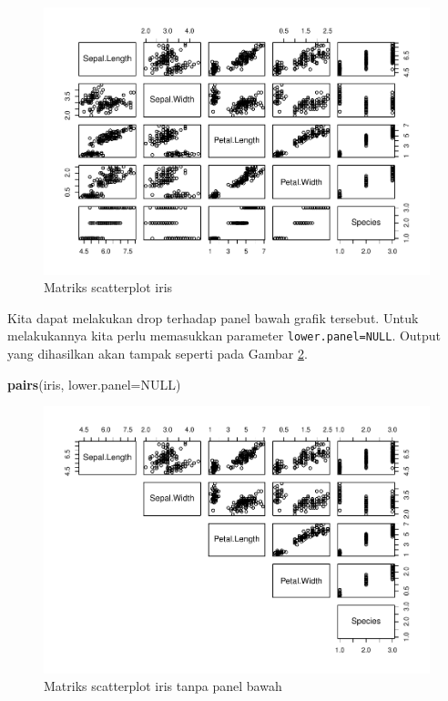 \documentclass[]{book}
\newenvironment{Shaded}{\begin{snugshade}}{\end{snugshade}}
\newcommand{\KeywordTok}[1]{\textcolor[rgb]{0.13,0.29,0.53}{\textbf{#1}}}
\newcommand{\DataTypeTok}[1]{\textcolor[rgb]{0.13,0.29,0.53}{#1}}
\newcommand{\OtherTok}[1]{\textcolor[rgb]{0.56,0.35,0.01}{#1}}
\newcommand{\NormalTok}[1]{#1}
\begin{document}
\begin{figure}

{\centering \includegraphics[width=0.8\linewidth]{EnvStat_files/figure-latex/matscat-1} 

}

\caption{Matriks scatterplot iris}\label{fig:matscat}
\end{figure}

Kita dapat melakukan drop terhadap panel bawah grafik tersebut. Untuk
melakukannya kita perlu memasukkan parameter \texttt{lower.panel=NULL}.
Output yang dihasilkan akan tampak seperti pada Gambar
\ref{fig:matscat2}.

\begin{Shaded}
\begin{Highlighting}[]
\KeywordTok{pairs}\NormalTok{(iris, }\DataTypeTok{lower.panel=}\OtherTok{NULL}\NormalTok{)}
\end{Highlighting}
\end{Shaded}

\begin{figure}

{\centering \includegraphics[width=0.8\linewidth]{EnvStat_files/figure-latex/matscat2-1} 

}

\caption{Matriks scatterplot iris tanpa panel bawah}\label{fig:matscat2}
\end{figure}
\end{document}

